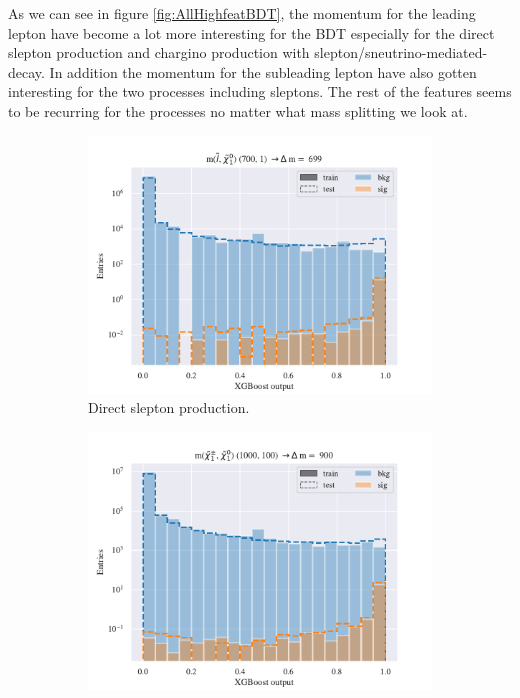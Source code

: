 As we can see in figure \ref{fig:AllHighfeatBDT}, the momentum for the leading lepton have become a lot more interesting for the BDT especially for the direct slepton production and chargino production with slepton/sneutrino-mediated-decay. In addition the momentum for the subleading lepton have also gotten interesting for the two processes including sleptons. The rest of the features seems to be recurring for the processes no matter what mass splitting we look at. 



\begin{figure}[H]
    \centering
    \begin{subfigure}[t!]{0.49\textwidth}
        \includegraphics[width = \textwidth]{Figures/SlepSlep/ML/BDT/All_level/High/scaled_train_test_396033.pdf}
        \caption{Direct slepton production.}
        \label{fig:SlepslepHigh}
    \end{subfigure}
    \begin{subfigure}[t!]{0.49\textwidth}
        \includegraphics[width = \textwidth]{Figures/SlepSnu/BDT/All_level/High/scaled_train_test_397169.pdf}

\end{subfigure}
\end{figure}
